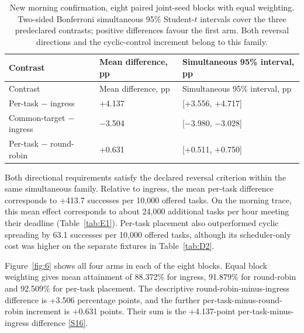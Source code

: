 \documentclass[12pt,a4paper]{article}
\begin{document}
\begingroup
\singlespacing\footnotesize\setlength{\tabcolsep}{3pt}
\renewcommand{\thetable}{7}
\begin{xltabular}{\textwidth}{@{}YYY@{}}
\caption[Eight-block simultaneous contrasts]{New morning confirmation, eight paired joint-seed blocks with equal weighting. Two-sided Bonferroni simultaneous 95\% Student-$t$ intervals cover the three predeclared contrasts; positive differences favour the first arm. Both reversal directions and the cyclic-control increment belong to this family.}\label{tab:7} \\
\toprule
Contrast & Mean difference, pp & Simultaneous 95\% interval, pp \\
\midrule\endfirsthead
\toprule
Contrast & Mean difference, pp & Simultaneous 95\% interval, pp \\
\midrule\endhead
\bottomrule\endfoot
Per-task \ensuremath{-} ingress & +4.137 & [+3.556, +4.717] \\
Common-target \ensuremath{-} ingress & \ensuremath{-}3.504 & [\ensuremath{-}3.980, \ensuremath{-}3.028] \\
Per-task \ensuremath{-} round-robin & +0.631 & [+0.511, +0.750] \\
\end{xltabular}
\endgroup

Both directional requirements satisfy the declared reversal criterion within the same simultaneous family. Relative to ingress, the mean per-task difference corresponds to +413.7 successes per 10,000 offered tasks. On the morning trace, this mean effect corresponds to about 24,000 additional tasks per hour meeting their deadline (Table~\ref{tab:E1}). Per-task placement also outperformed cyclic spreading by 63.1 successes per 10,000 offered tasks, although its scheduler-only cost was higher on the separate fixtures in Table~\ref{tab:D2}.

Figure~\ref{fig:6} shows all four arms in each of the eight blocks. Equal block weighting gives mean attainment of 88.372\% for ingress, 91.879\% for round-robin and 92.509\% for per-task placement. The descriptive round-robin-minus-ingress difference is +3.506 percentage points, and the further per-task-minus-round-robin increment is +0.631 points. Their sum is the +4.137-point per-task-minus-ingress difference \hyperref[source-s16]{[S16]}.
\end{document}
